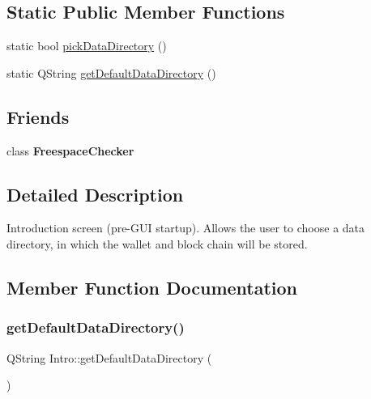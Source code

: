 \subsection*{Static Public Member Functions}
\begin{DoxyCompactItemize}
\item 
static bool \mbox{\hyperlink{class_intro_a3e0e541cd0e55fe71484055964925cfc}{pick\+Data\+Directory}} ()
\item 
static Q\+String \mbox{\hyperlink{class_intro_aad225845533fc7f451648dc7c9643e6a}{get\+Default\+Data\+Directory}} ()
\end{DoxyCompactItemize}
\subsection*{Friends}
\begin{DoxyCompactItemize}
\item 
\mbox{\label{class_intro_a79efd513440e3e26be2203f570653407}} 
class {\bfseries Freespace\+Checker}
\end{DoxyCompactItemize}


\subsection{Detailed Description}
Introduction screen (pre-\/\+G\+UI startup). Allows the user to choose a data directory, in which the wallet and block chain will be stored. 

\subsection{Member Function Documentation}
\mbox{\label{class_intro_aad225845533fc7f451648dc7c9643e6a}} 
\subsubsection{\texorpdfstring{getDefaultDataDirectory()}{getDefaultDataDirectory()}}
{\footnotesize\ttfamily Q\+String Intro\+::get\+Default\+Data\+Directory (\begin{DoxyParamCaption}{ }\end{DoxyParamCaption})\hspace{0.3cm}{\ttfamily [static]}}

